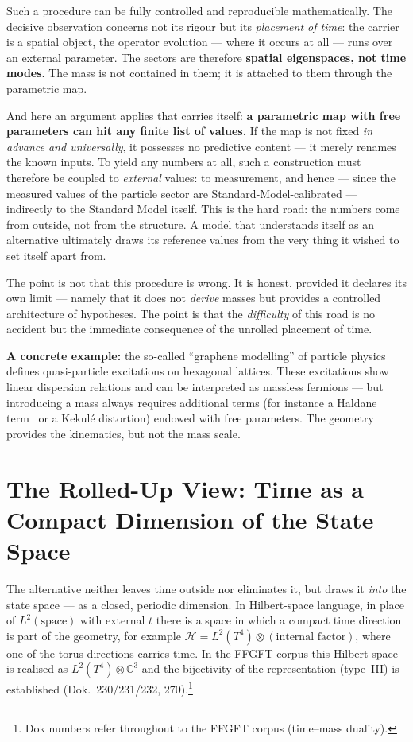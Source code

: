 \documentclass[11pt,a4paper]{article}
\begin{document}
Such a procedure can be fully controlled and reproducible mathematically. The decisive observation concerns not its rigour but its \emph{placement of time}: the carrier is a spatial object, the operator evolution --- where it occurs at all --- runs over an external parameter. The sectors are therefore \textbf{spatial eigenspaces, not time modes}. The mass is not contained in them; it is attached to them through the parametric map.

And here an argument applies that carries itself: \textbf{a parametric map with free parameters can hit any finite list of values.} If the map is not fixed \emph{in advance and universally}, it possesses no predictive content --- it merely renames the known inputs. To yield any numbers at all, such a construction must therefore be coupled to \emph{external} values: to measurement, and hence --- since the measured values of the particle sector are Standard-Model-calibrated --- indirectly to the Standard Model itself. This is the hard road: the numbers come from outside, not from the structure. A model that understands itself as an alternative ultimately draws its reference values from the very thing it wished to set itself apart from.

The point is not that this procedure is wrong. It is honest, provided it declares its own limit --- namely that it does not \emph{derive} masses but provides a controlled architecture of hypotheses. The point is that the \emph{difficulty} of this road is no accident but the immediate consequence of the unrolled placement of time.

\textbf{A concrete example:} the so-called ``graphene modelling'' of particle physics~\cite{Jackiw1999,Sutherland1986} defines quasi-particle excitations on hexagonal lattices. These excitations show linear dispersion relations and can be interpreted as massless fermions --- but introducing a mass always requires additional terms (for instance a Haldane term~\cite{Haldane1988} or a Kekulé distortion) endowed with free parameters. The geometry provides the kinematics, but not the mass scale.

\section{The Rolled-Up View: Time as a Compact Dimension of the State Space}

The alternative neither leaves time outside nor eliminates it, but draws it \emph{into} the state space --- as a closed, periodic dimension. In Hilbert-space language, in place of $L^2(\text{space})$ with external $t$ there is a space in which a compact time direction is part of the geometry, for example $\mathcal{H} = L^2(T^4)\otimes(\text{internal factor})$, where one of the torus directions carries time. In the FFGFT corpus this Hilbert space is realised as $L^2(T^4)\otimes\mathbb{C}^3$ and the bijectivity of the representation (type~III) is established (Dok.~230/231/232, 270).\footnote{Dok numbers refer throughout to the FFGFT corpus (time--mass duality).}
\end{document}
